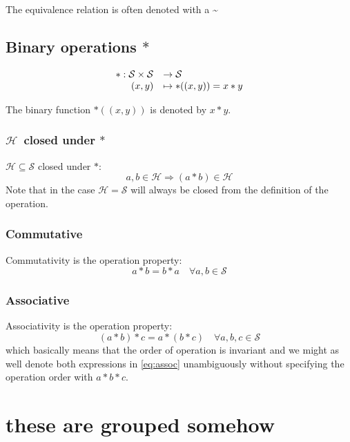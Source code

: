 \documentclass[a4paper,11pt]{kth-mag}
\renewcommand{\SS}{\ensuremath{\mathcal{S}}}
\newcommand{\HH}{\ensuremath{\mathcal{H}}}
\begin{document}
The equivalence relation is often denoted with a \textasciitilde

\subsection{Binary operations $*$}
\begin{equation}
     \begin{array}{r l}
         * : \SS \times \SS &\rightarrow \SS \\
                       (x,y)&\mapsto *((x,y))=x*y
     \end{array}
\end{equation}

The binary function $*((x,y))$ is denoted by $x*y$.

\subsubsection{\HH\, closed under $*$}
$\HH\subseteq\SS$ closed under $*$:
\begin{equation}
    \label{eq:closed}
    a,b \in \HH \Rightarrow (a*b) \in \HH 
\end{equation}
Note that in the case $\HH=\SS$ will always be closed from the definition of
the operation.


\subsubsection{Commutative}
Commutativity is the operation property:
\begin{equation}
    \label{eq:comm}
    a*b=b*a \quad \forall a,b \in \SS 
\end{equation}

\subsubsection{Associative}
Associativity is the operation property:
\begin{equation}
    \label{eq:assoc}
    (a*b)*c = a*(b*c) \quad \forall a,b,c \in \SS
\end{equation}
which basically means that the order of operation is invariant and we might as
well denote both expressions in \eqref{eq:assoc} unambiguously without specifying
the operation order with $a*b*c$.

\section{these are grouped somehow}
\end{document}
